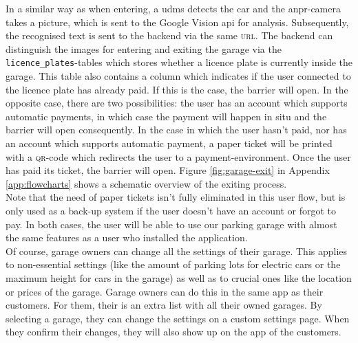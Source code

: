\ind In a similar way as when entering, a \ac{udms} detects the car and the \ac{anpr}-camera takes a picture, which is sent to the Google Vision \ac{api} for analysis. Subsequently, the recognised text is sent to the backend via the same \textsc{url}. The backend can distinguish the images for entering and exiting the garage via the \verb|licence_plates|-tables which stores whether a licence plate is currently inside the garage. This table also contains a column which indicates if the user connected to the licence plate has already paid. If this is the case, the barrier will open. In the opposite case, there are two possibilities: the user has an account which supports automatic payments, in which case the payment will happen in situ and the barrier will open consequently. In the case in which the user hasn't paid, nor has an account which supports automatic payment, a paper ticket will be printed with a \textsc{qr}-code which redirects the user to a payment-environment. Once the user has paid its ticket, the barrier will open. Figure \ref{fig:garage-exit} in Appendix \ref{app:flowcharts} shows a schematic overview of the exiting process. \\


Note that the need of paper tickets isn't fully eliminated in this user flow, but is only used as a back-up system if the user doesn't have an account or forgot to pay. In both cases, the user will be able to use our parking garage with almost the same features as a user who installed the application. \\


Of course, garage owners can change all the settings of their garage. This applies to non-essential settings (like the amount of parking lots for electric cars or the maximum height for cars in the garage) as well as to crucial ones like the location or prices of the garage. Garage owners can do this in the same app as their customers. For them, their is an extra list with all their owned garages. By selecting a garage, they can change the settings on a custom settings page. When they confirm their changes, they will also show up on the app of the customers. \\ %